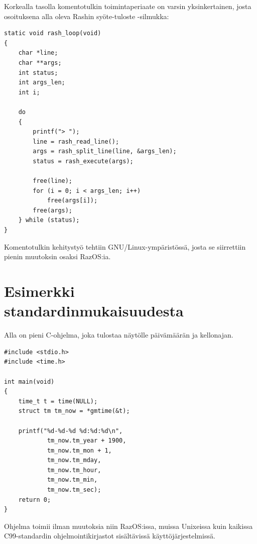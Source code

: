 \par

Korkealla tasolla komentotulkin toimintaperiaate on varsin yksinkertainen, josta osoituksena alla oleva Rashin syöte-tuloste -silmukka:

\begin{footnotesize}
\begin{verbatim}
static void rash_loop(void)
{
    char *line;
    char **args;
    int status;
    int args_len;
    int i;

    do
    {
        printf("> ");
        line = rash_read_line();
        args = rash_split_line(line, &args_len);
        status = rash_execute(args);

        free(line);
        for (i = 0; i < args_len; i++)
            free(args[i]);
        free(args);
    } while (status);
}
\end{verbatim}
\end{footnotesize}

Komentotulkin kehitystyö tehtiin GNU/Linux-ympäristössä, josta se siirrettiin pienin muutoksin osaksi RazOS:ia.

\section{Esimerkki standardinmukaisuudesta}

Alla on pieni C-ohjelma, joka tulostaa näytölle päivämäärän ja kellonajan.

\begin{footnotesize}
\begin{verbatim}
#include <stdio.h>
#include <time.h>

int main(void)
{
	time_t t = time(NULL);
	struct tm tm_now = *gmtime(&t);

	printf("%d-%d-%d %d:%d:%d\n",
			tm_now.tm_year + 1900,
			tm_now.tm_mon + 1,
			tm_now.tm_mday,
			tm_now.tm_hour,
			tm_now.tm_min,
			tm_now.tm_sec);
	return 0;
}
\end{verbatim}
\end{footnotesize}

Ohjelma toimii ilman muutoksia niin RazOS:issa, muissa Unixeissa kuin kaikissa C99-standardin ohjelmointikirjastot sisältävissä käyttöjärjestelmissä.
